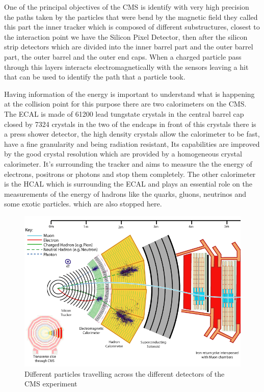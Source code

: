 One of the principal objectives of the CMS is identify with very high precision the paths taken by the particles that were bend by the magnetic field they called this part the inner tracker which is composed of different substructures, closest to the interaction point we have the Silicon Pixel Detector, then after the silicon strip detectors which are divided into the inner barrel part and the outer barrel part, the outer barrel and the outer end caps. When a charged particle pass through this layers interacts electromagnetically with the sensors leaving a hit that can be used to identify the path that a particle took. \cite{CMS1}


Having information of the energy is important to understand what is happening at the collision point for this purpose there are two calorimeters on the CMS. The ECAL is made of 61200 lead tungstate crystals in the central barrel cap closed by 7324 crystals in the two of the endcaps in front of this crystals there is a press shower detector, the high density crystals allow  the calorimeter to be fast, have a fine granularity and being radiation resistant, Its capabilities are improved by the good crystal resolution which are provided by a homogeneous crystal calorimeter. It's surrounding the tracker and aims to measure the the energy of electrons, positrons or photons and stop them completely. The other calorimeter is the HCAL which is surrounding the ECAL and plays an essential role on the measurements of the energy of hadrons like the quarks, gluons, neutrinos and some exotic particles. which are also stopped here.  
\\

\begin{figure}[h]
    \centering
    \includegraphics[width=1\textwidth]{cms.png}
     \caption{Different particles travelling across the different detectors of the CMS experiment}
    \label{fig:four-forces}
\end{figure}

